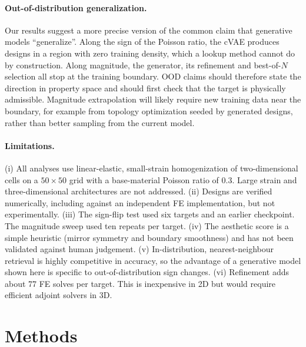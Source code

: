 \documentclass[a4paper,11pt]{article}
\begin{document}
\paragraph{Out-of-distribution generalization.}
Our results suggest a more precise version of the common claim that
generative models ``generalize''. Along the sign of the Poisson ratio, the
cVAE produces designs in a region with zero training density, which a lookup
method cannot do by construction. Along magnitude, the generator, its
refinement and best-of-$N$ selection all stop at the training boundary. OOD
claims should therefore state the direction in property space and should
first check that the target is physically admissible. Magnitude
extrapolation will likely require new training data near the boundary, for
example from topology optimization seeded by generated designs, rather than
better sampling from the current model.

\paragraph{Limitations.}
(i) All analyses use linear-elastic, small-strain homogenization of
two-dimensional cells on a $50\times50$ grid with a base-material Poisson
ratio of 0.3. Large strain and three-dimensional architectures are not
addressed.
(ii) Designs are verified numerically, including against an independent FE
implementation, but not experimentally.
(iii) The sign-flip test used six targets and an earlier checkpoint. The
magnitude sweep used ten repeats per target.
(iv) The aesthetic score is a simple heuristic (mirror symmetry and boundary
smoothness) and has not been validated against human judgement.
(v) In-distribution, nearest-neighbour retrieval is highly competitive in
accuracy, so the advantage of a generative model shown here is specific to
out-of-distribution sign changes.
(vi) Refinement adds about 77 FE solves per target. This is inexpensive in
2D but would require efficient adjoint solvers in 3D.

\section{Methods}
\end{document}
